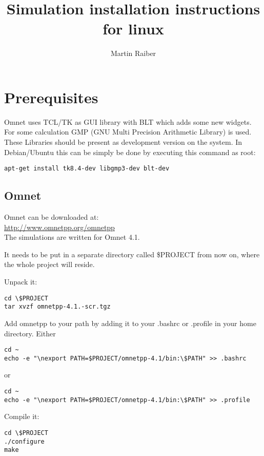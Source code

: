 \documentclass[a4paper,10pt]{article}
\begin{document}
\title{Simulation installation instructions for linux}
\author{Martin Raiber}


\maketitle

\newpage

\section{Prerequisites}

Omnet uses TCL/TK as GUI library with BLT which adds some new widgets. For some calculation GMP (GNU Multi Precision Arithmetic Library) is used. These Libraries should be present as development version on the system. In Debian/Ubuntu this can be simply be done by executing this command as root:

\begin{lstlisting}
apt-get install tk8.4-dev libgmp3-dev blt-dev
\end{lstlisting}

\subsection{Omnet}

Omnet can be downloaded at:\\
\href{http://www.omnetpp.org/omnetpp}{http://www.omnetpp.org/omnetpp}\\

The simulations are written for Omnet 4.1.

It needs to be put in a separate directory called \$PROJECT from now on, where the whole project will reside.

Unpack it:
\begin{lstlisting}
cd \$PROJECT
tar xvzf omnetpp-4.1.-scr.tgz
\end{lstlisting}

Add omnetpp to your path by adding it to your .bashrc or .profile in your home directory. Either
\begin{lstlisting}
cd ~
echo -e "\nexport PATH=$PROJECT/omnetpp-4.1/bin:\$PATH" >> .bashrc
\end{lstlisting}
or
\begin{lstlisting}
cd ~
echo -e "\nexport PATH=$PROJECT/omnetpp-4.1/bin:\$PATH" >> .profile
\end{lstlisting}

Compile it:
\begin{lstlisting}
cd \$PROJECT
./configure
make
\end{lstlisting}
\end{document}

